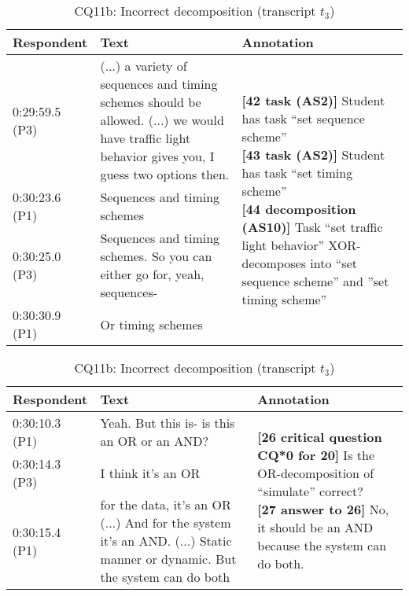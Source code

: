 \begin{table}[!htbp]
\centering
\begin{tabular}{|p{20mm}|p{70mm}|p{60mm}|}
\hline
Respondent & Text & Annotation\\
\hline
0:29:59.5 (P3) & (...) a variety of sequences and timing schemes should be allowed.  (...) we would have traffic light behavior gives you, I guess two options then. & \multirow{4}{60mm}{\textbf{[42 task (AS2)]} Student has task ``set sequence scheme''\newline
\textbf{[43 task (AS2)]} Student has task ``set timing scheme'' \newline
\textbf{[44 decomposition (AS10)] }Task ``set traffic light behavior'' XOR-decomposes into ``set sequence scheme'' and ''set timing scheme''}\\
\cline{1-2}
0:30:23.6 (P1) & Sequences and timing schemes &\\
\cline{1-2}
0:30:25.0 (P3) & Sequences and timing schemes. So you can either go for, yeah, sequences-&\\
\cline{1-2}
0:30:30.9 (P1) & Or timing schemes&\\
\hline	
\end{tabular}
\caption{AS2: Task, AS10: Task decomposition (transcript $t_2$)}
\label{table:transcript:as2-as10}

\begin{tabular}{|p{20mm}|p{70mm}|p{60mm}|}
\hline
Respondent & Text & Annotation\\
\hline
0:30:10.3 (P1) & 	Yeah. But this is- is this an OR or an AND? & \multirow{3}{60mm}{\textbf{[26 critical question CQ*0 for 20]} Is the OR-decomposition of ``simulate'' correct?\newline
\textbf{[27 answer to 26]} No, it should be an AND because the system can do both.}\\
\cline{1-2}
0:30:14.3 (P3) &I think it's an OR&\\
\cline{1-2}
0:30:15.4 (P1) & for the data, it's an OR (...) And for the system it's an AND. (...) Static manner or dynamic. But the system can do both&\\
\hline	
\end{tabular}
\caption{CQ11b: Incorrect decomposition (transcript $t_3$)}
\label{table:transcript:cq11b}


\end{table}
